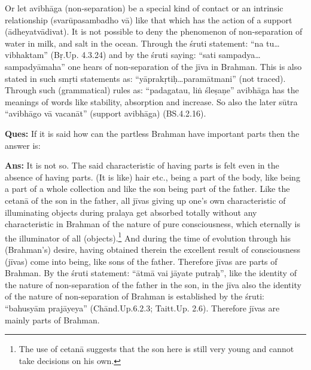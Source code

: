 Or let avibhāga (non-separation) be a special kind of contact or an intrinsic relationship (svarūpasambadho vā) like that which has the action of a support (ādheyatvādivat). It is not possible to deny the phenomenon of non-separation of water in milk, and salt in the ocean. Through the śruti statement:  “na tu…vibhaktam” (Bṛ.Up. 4.3.24) and by the śruti saying: “sati sampadya…sampadyāmaha” one hears of non-separation of the jīva in Brahman. This is also stated in such smṛti statements as: “yāprakṛtiḥ…paramātmani” (not traced).   Through such (grammatical) rules as: “padagatau, liṅ śleṣaṇe” avibhāga has the meanings of words like stability, absorption and increase. So also the later sūtra “avibhāgo vā vacanāt” (support avibhāga) (BS.4.2.16).

\textbf{Ques:} If it is said how can the partless Brahman have important parts then the answer is: 

\textbf{Ans:} It is not so. The said characteristic of having parts is felt even in the absence of having parts. (It is like) hair etc., being  a part of the body, like being a part of a whole collection and like the son being part of the father. Like the cetanā of the son in the father, all jīvas giving up one’s own characteristic of illuminating objects during pralaya get absorbed totally without any characteristic in Brahman of the nature of pure consciousness, which eternally is the illuminator of all (objects).\footnote{The use of cetanā suggests that the son here is still very young and cannot take decisions on his own.} And during the time of evolution through his (Brahman’s) desire, having obtained therein the excellent result of consciousness (jīvas) come into being, like sons of the father. Therefore jīvas are parts of Brahman. By the śruti statement: “ātmā vai jāyate putraḥ”,  like the identity of the nature of non-separation of the father in the son, in the jīva also the identity of the nature of non-separation of Brahman is established by the śruti: “bahusyām prajāyeya” (Chānd.Up.6.2.3; Taitt.Up. 2.6). Therefore jīvas are mainly parts of Brahman. 

\eject


